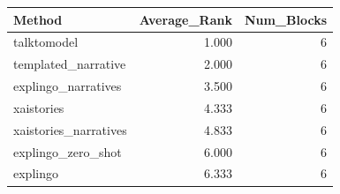 \begin{tabular}{lrr}
\toprule
Method & Average_Rank & Num_Blocks \\
\midrule
talktomodel & 1.000 & 6 \\
templated_narrative & 2.000 & 6 \\
explingo_narratives & 3.500 & 6 \\
xaistories & 4.333 & 6 \\
xaistories_narratives & 4.833 & 6 \\
explingo_zero_shot & 6.000 & 6 \\
explingo & 6.333 & 6 \\
\bottomrule
\end{tabular}
